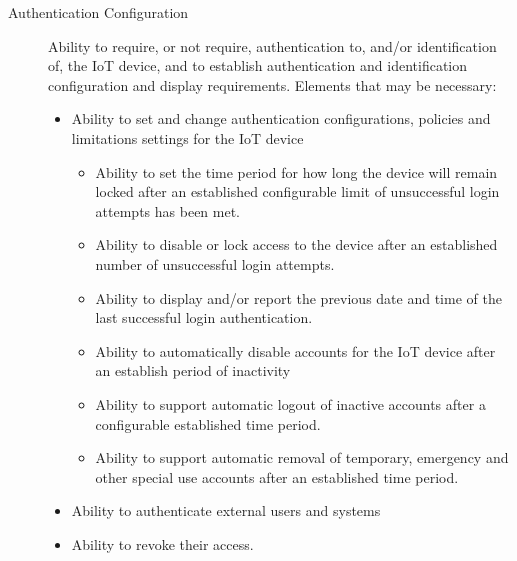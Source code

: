\begin{description}
    \item[Authentication Configuration] Ability to require, or not require, authentication to, and/or identification of, the IoT device, and to establish authentication and identification configuration and display requirements. Elements that may be necessary:
    \begin{itemize}
        \item Ability to set and change authentication configurations, policies and limitations settings for the IoT device
        \begin{itemize}
            \item Ability to set the time period for how long the device will remain locked after an established configurable limit of unsuccessful login attempts has been met.
            \item Ability to disable or lock access to the device after an established number of unsuccessful login attempts.
            \item Ability to display and/or report the previous date and time of the last successful login authentication.
            \item Ability to automatically disable accounts for the IoT device after an establish period of inactivity
            \item Ability to support automatic logout of inactive accounts after a configurable established time period.
            \item Ability to support automatic removal of temporary, emergency and other special use accounts after an established time period.
        \end{itemize}
        \item Ability to authenticate external users and systems
        \item Ability to revoke their access.
    \end{itemize}
    

\end{description}
